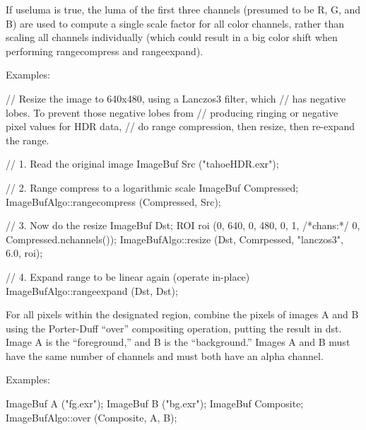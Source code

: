 If {\cf useluma} is true, the luma of the first three channels (presumed
to be R, G, and B) are used to compute a single scale factor for all
color channels, rather than scaling all channels individually (which
could result in a big color shift when performing {\cf rangecompress}
and {\cf rangeexpand}).

\smallskip
\noindent Examples:
\begin{code}
    // Resize the image to 640x480, using a Lanczos3 filter, which
    // has negative lobes. To prevent those negative lobes from
    // producing ringing or negative pixel values for HDR data,
    // do range compression, then resize, then re-expand the range.

    // 1. Read the original image
    ImageBuf Src ("tahoeHDR.exr");

    // 2. Range compress to a logarithmic scale
    ImageBuf Compressed;
    ImageBufAlgo::rangecompress (Compressed, Src);

    // 3. Now do the resize
    ImageBuf Dst;
    ROI roi (0, 640, 0, 480, 0, 1, /*chans:*/ 0, Compressed.nchannels());
    ImageBufAlgo::resize (Dst, Comrpessed, "lanczos3", 6.0, roi);

    // 4. Expand range to be linear again (operate in-place)
    ImageBufAlgo::rangeexpand (Dst, Dst);
\end{code}
\apiend


 

For all pixels within the designated region, combine the pixels of
images {\cf A} and {\cf B} using the Porter-Duff ``over'' compositing
operation, putting the result in {\cf dst}.  Image {\cf A} is the
``foreground,'' and {\cf B} is the ``background.''  Images {\cf A} and
{\cf B} must have the same number of channels and must both have an
alpha channel.

\smallskip
\noindent Examples:
\begin{code}
    ImageBuf A ("fg.exr");
    ImageBuf B ("bg.exr");
    ImageBuf Composite;
    ImageBufAlgo::over (Composite, A, B);
\end{code}
\apiend


 

